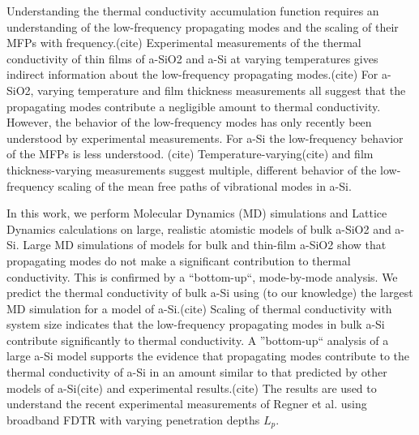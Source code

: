 \documentclass[aps,prb,twocolumn,superscriptaddress,footinbib,amsmath,amssymb,floatfix]{revtex4}
\begin{document}
Understanding the thermal conductivity accumulation function 
requires an understanding of the low-frequency propagating 
modes and the scaling of their MFPs with 
frequency.(cite) 
Experimental measurements of the thermal conductivity of
thin films of a-SiO2 and a-Si at varying temperatures 
gives indirect information about the low-frequency propagating 
modes.(cite) For a-SiO2, 
varying temperature 
and film thickness
\cite{lee_heat_1997,yamane_measurement_2002} 
measurements all suggest that the propagating modes 
contribute a negligible amount to thermal conductivity. 
However, the behavior of the low-frequency modes 
has only recently been understood by experimental 
measurements.
\cite{masciovecchio_evidence_2006,baldi_thermal_2008,
baldi_sound_2010,baldi_elastic_2011,baldi_emergence_2013} 
For a-Si the low-frequency behavior of the MFPs is less understood.
(cite) 
Temperature-varying(cite) and film thickness-varying measurements
\cite{pompe_thermal_1988,cahill_thermal_1989,hasselman_thermal_1989,
kuo_thermal_1992,feldman_thermal_1993,cahill_thermal_1994,
wada_thermal_1996,feldman_numerical_1999,
moon_thermal_2002,zink_thermal_2006,zink_excess_2006,liu_high_2009,
yang_anomalously_2010}
suggest multiple, different behavior of the low-frequency 
scaling of the mean free paths of vibrational modes in a-Si. 

In this work, we perform Molecular Dynamics (MD) simulations and 
Lattice Dynamics calculations on large, realistic atomistic models 
of bulk a-SiO2 and a-Si. Large MD 
simulations of models for bulk and thin-film a-SiO2 show that 
propagating modes 
do not make a significant contribution to thermal conductivity. 
This is confirmed by a ``bottom-up``, mode-by-mode analysis.  
We predict the thermal conductivity of bulk a-Si using (to our 
knowledge) the largest MD simulation for a model of a-Si.(cite) 
Scaling 
of thermal conductivity with system size indicates that the 
low-frequency propagating modes in bulk a-Si contribute significantly 
to thermal conductivity. 
A ''bottom-up`` analysis of a large a-Si model supports the evidence 
that propagating 
modes contribute to the thermal 
conductivity of a-Si in an amount similar to that predicted by 
other models of a-Si(cite) and experimental results.(cite) 
The results are used to 
understand the recent experimental measurements of Regner et al. 
using broadband FDTR with varying 
penetration depths $L_p$.\cite{regner_broadband_2013}
\end{document}
